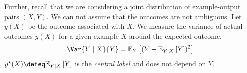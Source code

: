\documentclass[
	twoside=false, %
]{kaobook}
\begin{document}
Further, recall that we are considering a joint distribution of example-output pairs $(X,Y)$. We can not assume that the outcomes are not ambiguous. Let $y(X)$ be the outcome associated with $X$.
We measure the variance of actual outcomes $y(X)$ for a given example $X$ around the expected outcome.
$$
\Var{Y\mid X}{Y} = \mathbb{E}_{Y}\left[ (Y-\mathbb{E}_{Y\mid X}\left[ Y \right] )^2 \right] 
$$
$y^\star(X) \defeq \mathbb{E}_{Y \mid X}\left[ Y \right]$ is the \textit{central label} and does not depend on $Y$.


\end{document}
